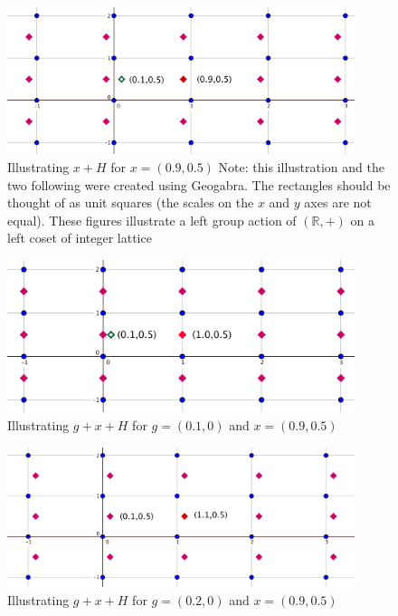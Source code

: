\begin{figure}[ht]
\begin{center}
\includegraphics[width=4.0in]{images/IntLat1.png}
\caption{Illustrating $x+H$ for $x=(0.9,0.5)$ Note: this illustration and the two following were created using Geogabra.  The rectangles should be thought of as unit squares (the scales on the $x$ and $y$ axes are not equal).   These figures illustrate a left group action of $(\mathbb{R},+)$ on a left coset of integer lattice}
\label{fig:IntegerLattice1}
\end{center}
\end{figure}

\begin{figure}[ht]
\begin{center}
\includegraphics[width=4.0in]{images/IntLat2.png}
\caption{Illustrating $g+x+H$ for $g=(0.1,0)$ and $x=(0.9,0.5)$}
\label{fig:IntegerLattice2}
\end{center}
\end{figure}


\begin{figure}[ht]
\begin{center}
\includegraphics[width=4.0in]{images/IntLat3.png}
\caption{Illustrating $g+x+H$ for $g=(0.2,0)$ and $x=(0.9,0.5)$}
\label{fig:IntegerLattice3}
\end{center}
\end{figure}


